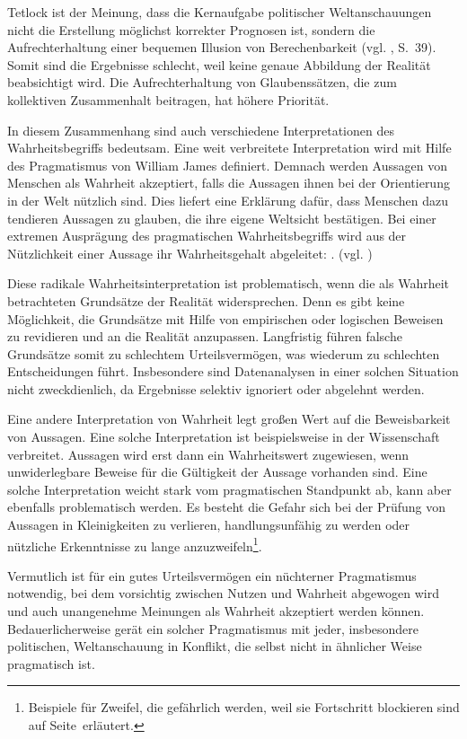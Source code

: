 Tetlock ist der Meinung, dass die Kernaufgabe politischer Weltanschauungen
nicht die Erstellung möglichst korrekter Prognosen ist, sondern die
Aufrechterhaltung einer bequemen Illusion von Berechenbarkeit
(vgl. \cite{Tetlock}, S.~39). Somit sind die Ergebnisse schlecht, weil keine
genaue Abbildung der Realität beabsichtigt wird. Die Aufrechterhaltung von
Glaubenssätzen, die zum kollektiven Zusammenhalt beitragen, hat höhere
Priorität.

In diesem Zusammenhang sind auch verschiedene Interpretationen des
Wahrheitsbegriffs bedeutsam. Eine weit verbreitete Interpretation wird mit
Hilfe des Pragmatismus von William James definiert. Demnach werden
Aussagen von Menschen als Wahrheit akzeptiert, falls die Aussagen ihnen bei der
Orientierung in der Welt nützlich sind. Dies liefert eine Erklärung dafür, dass
Menschen dazu tendieren Aussagen zu glauben, die ihre eigene Weltsicht
bestätigen. Bei einer extremen Ausprägung des pragmatischen Wahrheitsbegriffs
wird aus der Nützlichkeit einer Aussage ihr Wahrheitsgehalt abgeleitet:
\grqq. (vgl. \cite{Precht})

Diese radikale Wahrheitsinterpretation ist problematisch, wenn die als Wahrheit
betrachteten Grundsätze der Realität widersprechen. Denn es gibt keine
Möglichkeit, die Grundsätze mit Hilfe von empirischen oder logischen Beweisen
zu revidieren und an die Realität anzupassen. Langfristig führen falsche
Grundsätze somit zu schlechtem Urteilsvermögen, was wiederum zu schlechten
Entscheidungen führt. Insbesondere sind Datenanalysen in einer solchen Situation
nicht zweckdienlich, da Ergebnisse selektiv ignoriert oder abgelehnt werden.

Eine andere Interpretation von Wahrheit legt großen Wert auf die Beweisbarkeit
von Aussagen. Eine solche Interpretation ist beispielsweise in der Wissenschaft
verbreitet. Aussagen wird erst dann ein Wahrheitswert zugewiesen, wenn
unwiderlegbare Beweise für die Gültigkeit der Aussage vorhanden sind. Eine
solche Interpretation weicht stark vom pragmatischen Standpunkt ab, kann aber
ebenfalls problematisch werden. Es besteht die Gefahr sich bei der Prüfung von
Aussagen in Kleinigkeiten zu verlieren, handlungsunfähig zu werden oder
nützliche Erkenntnisse zu lange anzuzweifeln\footnote{
Beispiele für Zweifel, die gefährlich werden, weil sie Fortschritt blockieren
sind auf Seite~\xcom erläutert.
}.

Vermutlich ist für ein gutes Urteilsvermögen ein nüchterner Pragmatismus
notwendig, bei dem vorsichtig zwischen Nutzen und Wahrheit abgewogen wird und
auch unangenehme Meinungen als Wahrheit akzeptiert werden können.
Bedauerlicherweise gerät ein solcher Pragmatismus mit jeder, insbesondere
politischen, Weltanschauung in Konflikt, die selbst nicht in ähnlicher Weise
pragmatisch ist.

